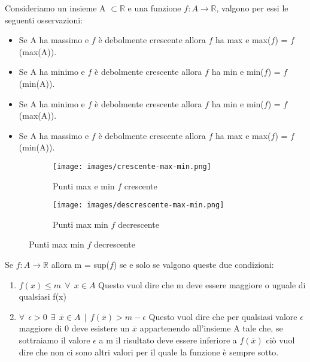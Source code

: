 \begin{observation}
    Consideriamo un insieme A $\subset \mathbb{R}$ e una funzione $f: A \longrightarrow \mathbb{R}$, valgono per essi le seguenti osservazioni:
    \begin{itemize}
        \item Se A ha massimo e $f$ è debolmente crescente allora $f$ ha max e max($f$) = $f$(max(A)).
        \item Se A ha minimo e $f$ è debolmente crescente allora $f$ ha min e min($f$) = $f$(min(A)).
        \item Se A ha minimo e $f$ è debolmente crescente allora $f$ ha min e min($f$) = $f$(max(A)).
        \item Se A ha massimo e $f$ è debolmente crescente allora $f$ ha max e max($f$) = $f$(min(A)).
    \end{itemize}
\end{observation}
\begin{figure}[h!]
    \begin{subfigure}{.5\textwidth}
        \centering
        \texttt{[image: images/crescente-max-min.png]}
        \caption{Punti max e min $f$ crescente}
        \label{fig:my_label}
    \end{subfigure}
    \begin{subfigure}{.5\textwidth}
        \centering
        \texttt{[image: images/descrescente-max-min.png]}
        \caption{Punti max min $f$ decrescente}
        \label{fig:my_label}
    \end{subfigure}
\end{figure}
\begin{observation}
    Se $f: A \longrightarrow \mathbb{R}$ allora m = sup($f$) se e solo se valgono queste due condizioni:
    \begin{enumerate}
        \item $f(x) \leq m \: \: \forall \: \: x \in A$ \hspace{.3cm} Questo vuol dire che m deve essere maggiore o uguale di qualsiasi f(x)
        \item $\forall \: \: \epsilon > 0 \: \: \exists \: \:  \overline{x} \in A \: \: | \: \: f(\overline{x}) > m - \epsilon$ \hspace{.3cm} Questo vuol dire che per qualsiasi valore $\epsilon$ maggiore di 0 deve esistere un $\overline{x}$ appartenendo all'insieme A tale che, se sottraiamo il valore $\epsilon$ a m il risultato deve essere inferiore a $f(\overline{x})$ ciò vuol dire che non ci sono altri valori per il quale la funzione è sempre sotto.
    \end{enumerate}
\end{observation}
